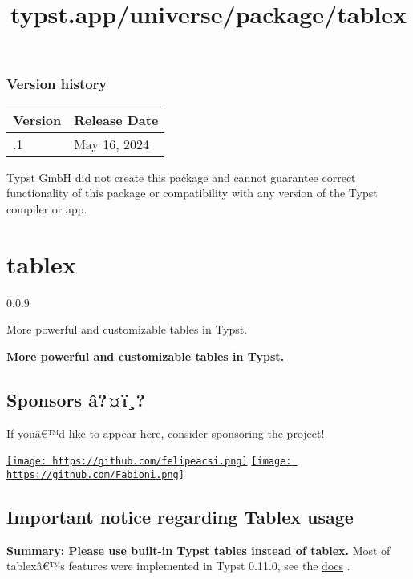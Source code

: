 \label{versions}
\subsubsection{Version history}\label{version-history}

\begin{longtable}[]{@{}ll@{}}
\toprule\noalign{}
Version & Release Date \\
\midrule\noalign{}
\endhead
\bottomrule\noalign{}
\endlastfoot
0.1.1 & May 16, 2024 \\
\end{longtable}

Typst GmbH did not create this package and cannot guarantee correct
functionality of this package or compatibility with any version of the
Typst compiler or app.


\title{typst.app/universe/package/tablex}

\label{banner}
\section{tablex}\label{tablex}

{ 0.0.9 }

More powerful and customizable tables in Typst.

\label{readme}
\textbf{More powerful and customizable tables in Typst.}

\subsection{Sponsors â?¤ï¸?}\label{sponsors-uxe2uxef}

If youâ€™d like to appear here,
\href{https://github.com/sponsors/PgBiel}{consider sponsoring the
project!}

\href{https://github.com/felipeacsi}{\texttt{[image: https://github.com/felipeacsi.png]}}
\href{https://github.com/Fabioni}{\texttt{[image: https://github.com/Fabioni.png]}}

\subsection{Important notice regarding Tablex
usage}\label{important-notice-regarding-tablex-usage}

\textbf{Summary: Please use built-in Typst tables instead of tablex.}
Most of tablexâ€™s features were implemented in Typst 0.11.0, see the
\href{https://typst.app/docs/reference/model/table/}{docs} .

